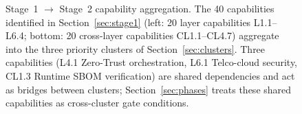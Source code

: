\documentclass[10pt]{article}
\begin{document}
\begin{figure}[p]
\caption{Stage~1 $\rightarrow$ Stage~2 capability aggregation. The 40 capabilities identified in Section~\ref{sec:stage1} (left: 20 layer capabilities L1.1--L6.4; bottom: 20 cross-layer capabilities CL1.1--CL4.7) aggregate into the three priority clusters of Section~\ref{sec:clusters}. Three capabilities (L4.1 Zero-Trust orchestration, L6.1 Telco-cloud security, CL1.3 Runtime SBOM verification) are shared dependencies and act as bridges between clusters; Section~\ref{sec:phases} treats these shared capabilities as cross-cluster gate conditions.}
\label{fig:cap-cluster}
\end{figure}
\end{document}
